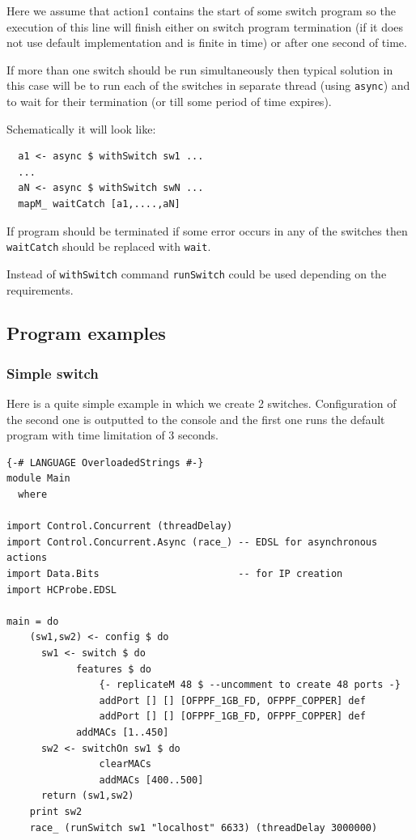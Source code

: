 \documentclass[9pt,a4paper]{article}
\begin{document}
Here we assume that action1 contains the start of some switch program so the
execution of this line will finish either on switch program
termination (if it does not use default implementation and is finite
in time) or after one second of time.

If more than one switch should be run simultaneously then typical
solution in this case will be to run each of the switches in separate
thread (using \lstinline!async!) and to wait for their termination (or
till some period of time expires).

Schematically it will look like:

\begin{lstlisting}
  a1 <- async $ withSwitch sw1 ...
  ...
  aN <- async $ withSwitch swN ...
  mapM_ waitCatch [a1,....,aN]
\end{lstlisting}

If program should be terminated if some error occurs in any of the
switches then \lstinline!waitCatch! should be replaced with
\lstinline!wait!.

Instead of \lstinline!withSwitch! command \lstinline!runSwitch! could
be used depending on the requirements.

\subsection{Program examples}

\subsubsection{Simple switch}

Here is a quite simple example in which we create 2
switches. Configuration of the second one is outputted to the console and
the first one runs the default program with time limitation of 3 seconds.

\begin{lstlisting}
{-# LANGUAGE OverloadedStrings #-}
module Main
  where

import Control.Concurrent (threadDelay)
import Control.Concurrent.Async (race_) -- EDSL for asynchronous actions
import Data.Bits                        -- for IP creation
import HCProbe.EDSL

main = do 
    (sw1,sw2) <- config $ do
      sw1 <- switch $ do
            features $ do
                {- replicateM 48 $ --uncomment to create 48 ports -}
                addPort [] [] [OFPPF_1GB_FD, OFPPF_COPPER] def
                addPort [] [] [OFPPF_1GB_FD, OFPPF_COPPER] def
            addMACs [1..450]
      sw2 <- switchOn sw1 $ do
                clearMACs 
                addMACs [400..500]
      return (sw1,sw2)
    print sw2
    race_ (runSwitch sw1 "localhost" 6633) (threadDelay 3000000)
\end{lstlisting}
\end{document}
